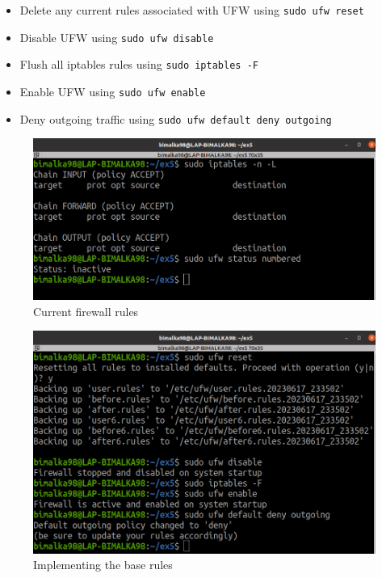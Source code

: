 \documentclass[11pt,letterpaper]{article}
\begin{document}
\begin{enumerate}
		\begin{itemize}
			\item Delete any current rules associated with UFW using \texttt{sudo ufw reset}
			\item Disable UFW using \texttt{sudo ufw disable}
			\item Flush all iptables rules using \texttt{sudo iptables -F}
			\item Enable UFW using \texttt{sudo ufw enable}
			\item Deny outgoing traffic using \texttt{sudo ufw default deny outgoing}
		\end{itemize}
	
		\begin{figure}[H]
			\centering
			\includegraphics[width=0.75\columnwidth]{images/part2/1.png}
			\caption{Current firewall rules}
		\end{figure}
		
		\begin{figure}[H]
			\centering
			\includegraphics[width=0.75\columnwidth]{images/part2/2.png}
			\caption{Implementing the base rules}
		\end{figure}
		

\end{enumerate}
\end{document}
